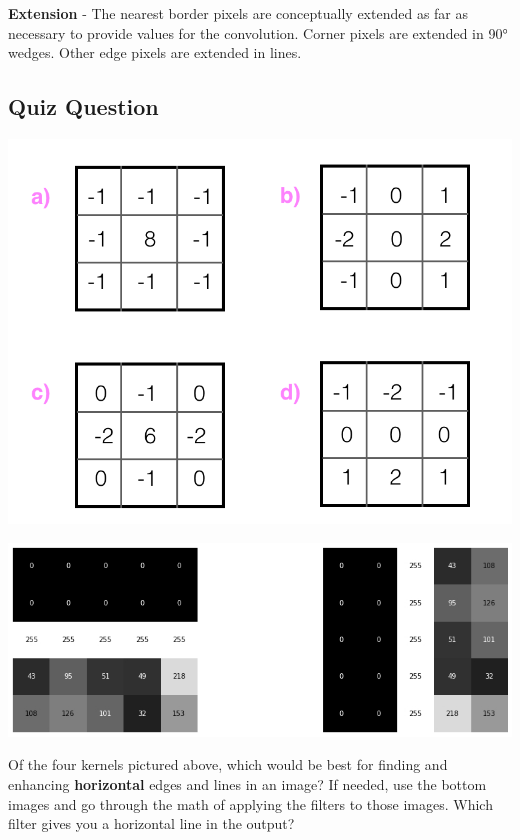 \textbf{Extension} - The nearest border pixels are conceptually extended as far as necessary to provide values for the convolution. Corner pixels are extended in 90° wedges. Other edge pixels are extended in lines.


\subsection{Quiz Question}

\includegraphics[width=1\linewidth]{img//cnn//concepts/screen-shot-2017-06-26-at-10.44.50-am.png}

\includegraphics[width=1\linewidth]{img//cnn//concepts/hey.jpeg}

Of the four kernels pictured above, which would be best for finding and enhancing \textbf{horizontal} edges and lines in an image? If needed, use the bottom images and go through the math of applying the filters to those images. Which filter gives you a horizontal line in the output? \newline

